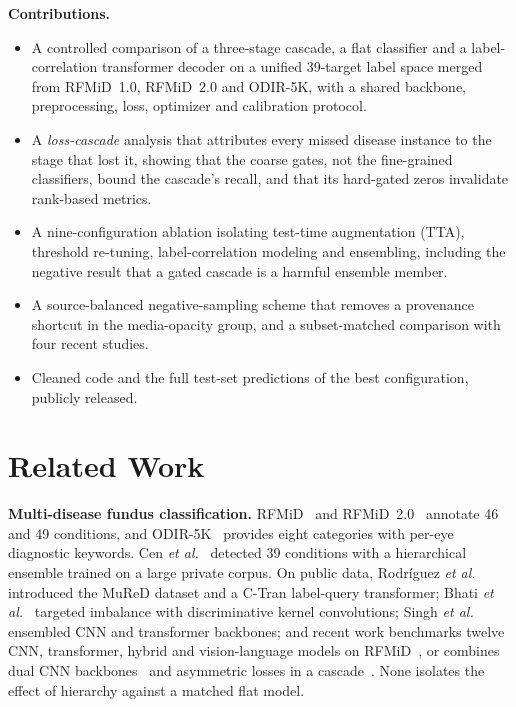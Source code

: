 \documentclass[conference]{IEEEtran}
\begin{document}
\textbf{Contributions.}
\begin{itemize}
\item A controlled comparison of a three-stage cascade, a flat classifier and a
label-correlation transformer decoder on a unified 39-target label space merged
from RFMiD~1.0, RFMiD~2.0 and ODIR-5K, with a shared backbone, preprocessing, loss,
optimizer and calibration protocol.
\item A \emph{loss-cascade} analysis that attributes every missed disease instance
to the stage that lost it, showing that the coarse gates, not the fine-grained
classifiers, bound the cascade's recall, and that its hard-gated zeros invalidate
rank-based metrics.
\item A nine-configuration ablation isolating test-time augmentation (TTA),
threshold re-tuning, label-correlation modeling and ensembling, including the
negative result that a gated cascade is a harmful ensemble member.
\item A source-balanced negative-sampling scheme that removes a provenance shortcut
in the media-opacity group, and a subset-matched comparison with four recent
studies.
\item Cleaned code and the full test-set predictions of the best configuration,
publicly released.
\end{itemize}

\section{Related Work}
\textbf{Multi-disease fundus classification.} RFMiD~\cite{pachade2021} and
RFMiD~2.0~\cite{panchal2023} annotate 46 and 49 conditions, and ODIR-5K~\cite{odir}
provides eight categories with per-eye diagnostic keywords. Cen \emph{et
al.}~\cite{cen2021} detected 39 conditions with a hierarchical ensemble trained on a
large private corpus. On public data, Rodr\'iguez \emph{et al.}~\cite{rodriguez2022}
introduced the MuReD dataset and a C-Tran label-query transformer;
Bhati \emph{et al.}~\cite{bhati2022} targeted imbalance with discriminative kernel
convolutions; Singh \emph{et al.}~\cite{singh2025} ensembled CNN and transformer
backbones; and recent work benchmarks twelve CNN, transformer, hybrid and
vision-language models on RFMiD~\cite{dey2026}, or combines dual CNN
backbones~\cite{mahmood2026} and asymmetric losses in a cascade~\cite{saikia2026}.
None isolates the effect of hierarchy against a matched flat model.
\end{document}
